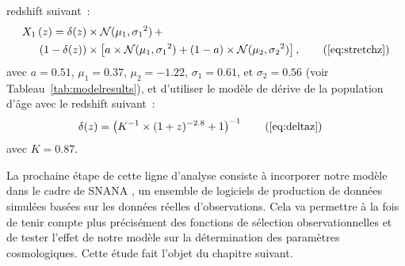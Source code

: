 \documentclass[../main/main.tex]{subfiles}
\begin{document}
\begin{enumerate}
        redshift suivant~:
        \begin{align*}\label{eqconclusion:stretchz}
            X_1\left(z \right) =
            \delta(z)&\times\mathcal{N}(\mu_1,\sigma_1{}^2)\,+\nonumber\\
            (1-\delta(z))&\times \left[a\times\mathcal{N}(\mu_1,\sigma_1{}^2) +
            (1-a)\times\mathcal{N}(\mu_2,\sigma_2{}^2)\right],
            \tag{\ref{eq:stretchz}}
        \end{align*}
        avec $a=0.51$, $\mu_1=0.37$, $\mu_2=-1.22$, $\sigma_1=0.61$, et
        $\sigma_2=0.56$ (voir Tableau~\ref{tab:modelresults}), et d'utiliser
        le modèle de dérive de la population d'âge avec le redshift suivant~:
        \begin{align*}
            \delta(z) & = \left( K^{-1} \times (1+z)^{-2.8} +1 \right)^{-1}
            \tag{\ref{eq:deltaz}}
        \end{align*}
        avec $K=0.87$.
\end{enumerate}

La prochaine étape de cette ligne d'analyse consiste à incorporer notre modèle
dans le cadre de SNANA \citep{kessler2009a}, un ensemble de logiciels de
production de données simulées basées sur les données réelles d'observations.
Cela va permettre à la fois de tenir compte plus
précisément des fonctions de sélection observationnelles et de tester l'effet
de notre modèle sur la détermination des paramètres cosmologiques. Cette étude
fait l'objet du chapitre suivant.

\clearpage

\thispagestyle{plain}
\vfill
\minilof
\vfill
\minilot
\vfill

% 
% 
\end{document}
